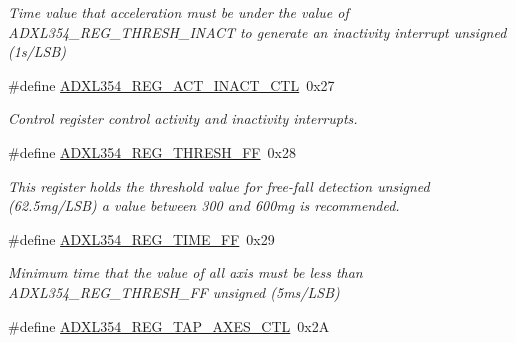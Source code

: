 \begin{DoxyCompactItemize}
\begin{DoxyCompactList}\small\item\em \-Time value that acceleration must be under the value of \-A\-D\-X\-L354\-\_\-\-R\-E\-G\-\_\-\-T\-H\-R\-E\-S\-H\-\_\-\-I\-N\-A\-C\-T to generate an inactivity interrupt unsigned (1s/\-L\-S\-B) \end{DoxyCompactList}\item 
\hypertarget{group___a_d_x_l354___r_e_g_i_s_t_e_r_s_ga98f467999df03dbbb52dea484b5a1cb3}{\#define \hyperlink{group___a_d_x_l354___r_e_g_i_s_t_e_r_s_ga98f467999df03dbbb52dea484b5a1cb3}{\-A\-D\-X\-L354\-\_\-\-R\-E\-G\-\_\-\-A\-C\-T\-\_\-\-I\-N\-A\-C\-T\-\_\-\-C\-T\-L}~0x27}\label{group___a_d_x_l354___r_e_g_i_s_t_e_r_s_ga98f467999df03dbbb52dea484b5a1cb3}

\begin{DoxyCompactList}\small\item\em \-Control register control activity and inactivity interrupts. \end{DoxyCompactList}\item 
\hypertarget{group___a_d_x_l354___r_e_g_i_s_t_e_r_s_ga06e36abf613046ae7d2610dc1f27c2fb}{\#define \hyperlink{group___a_d_x_l354___r_e_g_i_s_t_e_r_s_ga06e36abf613046ae7d2610dc1f27c2fb}{\-A\-D\-X\-L354\-\_\-\-R\-E\-G\-\_\-\-T\-H\-R\-E\-S\-H\-\_\-\-F\-F}~0x28}\label{group___a_d_x_l354___r_e_g_i_s_t_e_r_s_ga06e36abf613046ae7d2610dc1f27c2fb}

\begin{DoxyCompactList}\small\item\em \-This register holds the threshold value for free-\/fall detection unsigned (62.\-5mg/\-L\-S\-B) a value between 300 and 600mg is recommended. \end{DoxyCompactList}\item 
\hypertarget{group___a_d_x_l354___r_e_g_i_s_t_e_r_s_gad7b6e170e075e75d32f43ef5e7b1721f}{\#define \hyperlink{group___a_d_x_l354___r_e_g_i_s_t_e_r_s_gad7b6e170e075e75d32f43ef5e7b1721f}{\-A\-D\-X\-L354\-\_\-\-R\-E\-G\-\_\-\-T\-I\-M\-E\-\_\-\-F\-F}~0x29}\label{group___a_d_x_l354___r_e_g_i_s_t_e_r_s_gad7b6e170e075e75d32f43ef5e7b1721f}

\begin{DoxyCompactList}\small\item\em \-Minimum time that the value of all axis must be less than \-A\-D\-X\-L354\-\_\-\-R\-E\-G\-\_\-\-T\-H\-R\-E\-S\-H\-\_\-\-F\-F unsigned (5ms/\-L\-S\-B) \end{DoxyCompactList}\item 
\hypertarget{group___a_d_x_l354___r_e_g_i_s_t_e_r_s_gac2c1909b531e1e432ffa3a489d5f46d6}{\#define \hyperlink{group___a_d_x_l354___r_e_g_i_s_t_e_r_s_gac2c1909b531e1e432ffa3a489d5f46d6}{\-A\-D\-X\-L354\-\_\-\-R\-E\-G\-\_\-\-T\-A\-P\-\_\-\-A\-X\-E\-S\-\_\-\-C\-T\-L}~0x2\-A}\label{group___a_d_x_l354___r_e_g_i_s_t_e_r_s_gac2c1909b531e1e432ffa3a489d5f46d6}


\end{DoxyCompactItemize}
